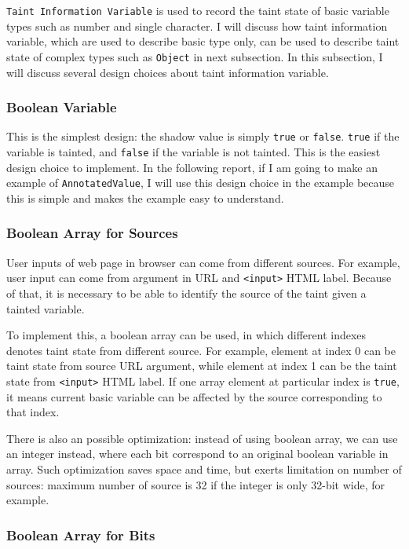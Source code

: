 \texttt{Taint Information Variable} is used to record the taint state of basic variable types such as number and single character. I will discuss how taint information variable, which are used to describe basic type only, can be used to describe taint state of complex types such as \texttt{Object} in next subsection. In this subsection, I will discuss several design choices about taint information variable. 

\subsubsection{Boolean Variable}

This is the simplest design: the shadow value is simply \texttt{true} or \texttt{false}. \texttt{true} if the variable is tainted, and \texttt{false} if the variable is not tainted. This is the easiest design choice to implement. In the following report, if I am going to make an example of \texttt{AnnotatedValue}, I will use this design choice in the example because this is simple and makes the example easy to understand.

\subsubsection{Boolean Array for Sources}

User inputs of web page in browser can come from different sources. For example, user input can come from argument in URL and \texttt{<input>} HTML label. Because of that, it is necessary to be able to identify the source of the taint given a tainted variable. 

To implement this, a boolean array can be used, in which different indexes denotes taint state from different source. For example, element at index 0 can be taint state from source URL argument, while element at index 1 can be the taint state from \texttt{<input>} HTML label. If one array element at particular index is \texttt{true}, it means current basic variable can be affected by the source corresponding to that index. 

There is also an possible optimization: instead of using boolean array, we can use an integer instead, where each bit correspond to an original boolean variable in array. Such optimization saves space and time, but exerts limitation on number of sources: maximum number of source is 32 if the integer is only 32-bit wide, for example.

\subsubsection{Boolean Array for Bits}


